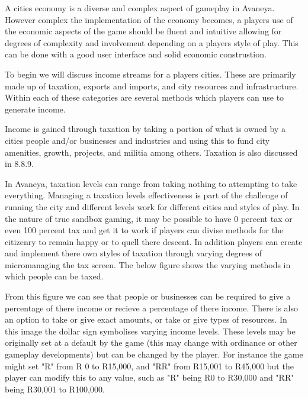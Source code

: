 


A cities economy is a diverse and complex aspect of gameplay in Avaneya. However complex the implementation of the economy becomes, a players use of the economic aspects of the game should be fluent and intuitive allowing for degrees of complexity and involvement depending on a players style of play. This can be done with a good user interface and solid economic construstion. 

To begin we will discuss income streams for a players cities. These are primarily made up of taxation, exports and imports, and city resources and infrastructure. Within each of these categories are several methods which players can use to generate income.


Income is gained through taxation by taking a portion of what is owned by a cities people and/or businesses and industries and using this to fund city amenities, growth, projects, and militia among others. Taxation is also discussed in 8.8.9.

In Avaneya, taxation levels can range from taking nothing to attempting to take everything. Managing a taxation levels effectiveness is part of the challenge of running the city and different levels work for different cities and styles of play. In the nature of true sandbox gaming, it may be possible to have 0 percent tax or even 100 percent tax and get it to work if players can divise methods for the citizenry to remain happy or to quell there descent. In addition players can create and implement there own styles of taxation through varying degrees of micromanaging the tax screen. The below figure shows the varying methods in which people can be taxed.


From this figure we can see that people or businesses can be required to give a percentage of there income or recieve a percentage of there income. There is also an option to take or give exact amounts, or take or give types of resources. In this image the dollar sign symbolises varying income levels. These levels may be originally set at a default by the game (this may change with ordinance or other gameplay developments) but can be changed by the player. For instance the game might set "R" from R 0 to R15,000, and "RR" from R15,001 to R45,000 but the player can modify this to any value, such as "R" being R0 to R30,000 and "RR" being R30,001 to R100,000. 

